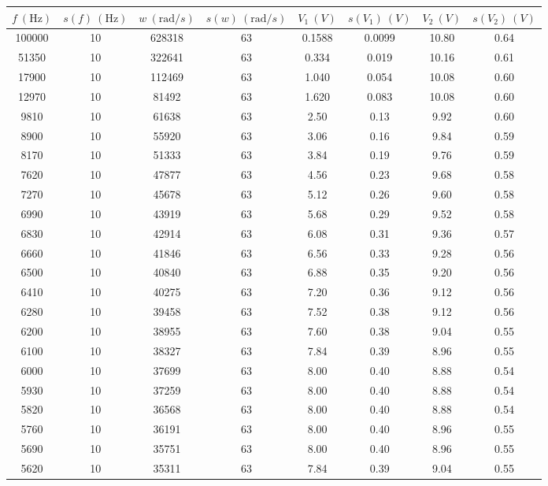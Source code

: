 \documentclass[12pt,a4paper]{article}
\newcommand{\Hz}{\mathrm{Hz} }
\begin{document}
\begin{table}[h!] 	 \centering 
\begin{tabular}{|c|c|c|c|c|c|c|c|} 

\hline 
$f  \ (\Hz) $  & $s(f) \ (\Hz)$ & $ w \ (\mathrm{rad}/s)$ & $s(w) \ (\mathrm{rad}/s)$ & $V_1 \ (V)  $ &  $s(V_1) \ (V)$ & $V_2 \ (V)$ & $ s(V_2) \ (V)$ \\ \hline 
100000  & 10 &  628318 & 63 & 0.1588 & 0.0099 & 10.80 & 0.64 \\ 
51350  & 10 &  322641 & 63 & 0.334 & 0.019 & 10.16 & 0.61 \\ 
17900  & 10 &  112469 & 63 & 1.040 & 0.054 & 10.08 & 0.60 \\ 
12970  & 10 &  81492 & 63 & 1.620 & 0.083 & 10.08 & 0.60 \\ 
9810  & 10 &  61638 & 63 & 2.50 & 0.13 & 9.92 & 0.60 \\ 
8900  & 10 &  55920 & 63 & 3.06 & 0.16 & 9.84 & 0.59 \\ 
8170  & 10 &  51333 & 63 & 3.84 & 0.19 & 9.76 & 0.59 \\ 
7620  & 10 &  47877 & 63 & 4.56 & 0.23 & 9.68 & 0.58 \\ 
7270  & 10 &  45678 & 63 & 5.12 & 0.26 & 9.60 & 0.58 \\ 
6990  & 10 &  43919 & 63 & 5.68 & 0.29 & 9.52 & 0.58 \\ 
6830  & 10 &  42914 & 63 & 6.08 & 0.31 & 9.36 & 0.57 \\ 
6660  & 10 &  41846 & 63 & 6.56 & 0.33 & 9.28 & 0.56 \\ 
6500  & 10 &  40840 & 63 & 6.88 & 0.35 & 9.20 & 0.56 \\ 
6410  & 10 &  40275 & 63 & 7.20 & 0.36 & 9.12 & 0.56 \\ 
6280  & 10 &  39458 & 63 & 7.52 & 0.38 & 9.12 & 0.56 \\ 
6200  & 10 &  38955 & 63 & 7.60 & 0.38 & 9.04 & 0.55 \\ 
6100  & 10 &  38327 & 63 & 7.84 & 0.39 & 8.96 & 0.55 \\ 
6000  & 10 &  37699 & 63 & 8.00 & 0.40 & 8.88 & 0.54 \\ 
5930  & 10 &  37259 & 63 & 8.00 & 0.40 & 8.88 & 0.54 \\ 
5820  & 10 &  36568 & 63 & 8.00 & 0.40 & 8.88 & 0.54 \\ 
5760  & 10 &  36191 & 63 & 8.00 & 0.40 & 8.96 & 0.55 \\ 
5690  & 10 &  35751 & 63 & 8.00 & 0.40 & 8.96 & 0.55 \\ 
5620  & 10 &  35311 & 63 & 7.84 & 0.39 & 9.04 & 0.55 \\ 

\end{tabular}
\end{table}
\end{document}
